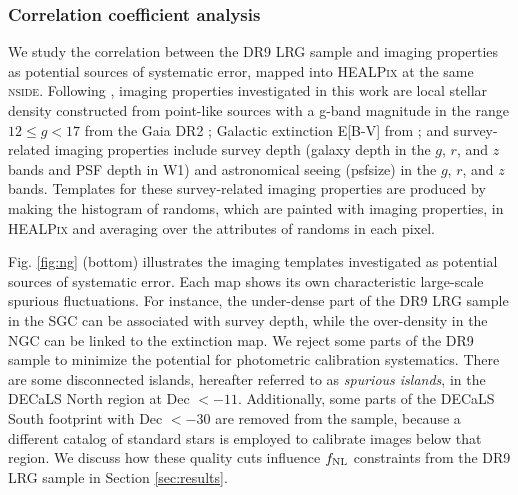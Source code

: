\subsubsection{Correlation coefficient analysis}
We study the correlation between the DR9 LRG sample and imaging properties as potential sources of systematic error, mapped into \textsc{HEALPix} at the same \textsc{nside}. Following \cite{zhou2022target}, imaging properties investigated in this work are local stellar density constructed from point-like sources with a g-band magnitude in the range $12 \leq g < 17$ from the Gaia DR2 \citep[see,][]{gaiadr2, myers2022}; Galactic extinction E[B-V] from \cite{schlegel1998maps}; and survey-related imaging properties include survey depth (galaxy depth in the $g$, $r$, and $z$ bands and PSF depth in W1) and astronomical seeing (psfsize) in the $g$, $r$, and $z$ bands. Templates for these survey-related imaging properties are produced by making the histogram of randoms, which are painted with imaging properties, in \textsc{HEALPix} and averaging over the attributes of randoms in each pixel. 

Fig. \ref{fig:ng} (bottom) illustrates the imaging templates investigated as potential sources of systematic error. Each map shows its own characteristic large-scale spurious fluctuations. For instance, the under-dense part of the DR9 LRG sample in the SGC can be associated with survey depth, while the over-density in the NGC can be linked to the extinction map. We reject some parts of the DR9 sample to minimize the potential for photometric calibration systematics. There are some disconnected islands, hereafter referred to as \textit{spurious islands}, in the DECaLS North region at Dec $< -11$. Additionally, some parts of the DECaLS South footprint with Dec $< -30$ are removed from the sample, because a different catalog of standard stars is employed to calibrate images below that region. We discuss how these quality cuts influence $f_{\rm NL}$ constraints from the DR9 LRG sample in Section \ref{sec:results}. 

